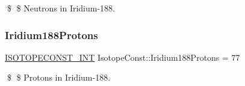 \$ \$ Neutrons in Iridium-\/188. \mbox{\label{group___isotope_const-_iridium-_ir188_ga8cd81901192d1e171ad4d29b91e8f3f7}} 
\subsubsection{\texorpdfstring{Iridium188\+Protons}{Iridium188Protons}}
{\footnotesize\ttfamily \mbox{\hyperlink{group___isotope_const-_macros_ga5f18360b3e99483a35c32d789e62621c}{I\+S\+O\+T\+O\+P\+E\+C\+O\+N\+S\+T\+\_\+\+I\+NT}} Isotope\+Const\+::\+Iridium188\+Protons = 77}

\$ \$ Protons in Iridium-\/188. 